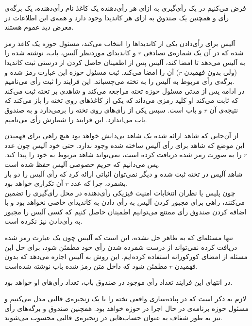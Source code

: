 \par
فرض می‌کنیم در یک رأی‌گیری به ازای هر رأی‌دهنده یک کاغذ نام رأی‌دهنده، یک برگه‌ی رأی و همچنین یک صندوق به ازای هر کاندیدا وجود دارد و همه‌ی این اطلاعات در معرض دید عموم هستند. 
\par
آلیس برای رأی‌دادن یکی از کاندیداها را انتخاب می‌کند، مسئول حوزه یک کاغذ رمز شده که در آن یک شماره‌ی تصادفی $r$ و کاندیدای موردنظر آلیس، باب، نوشته شده را به آلیس می‌دهد تا امضا کند، آلیس پس از اطمینان حاصل کردن از درستی ثبت کاندیدا (ولی بدون فهمیدن $r$) آن را امضا می‌کند. ثبت مسئول حوزه این عبارت رمز شده و برگه‌ی رأی مربوط به آلیس را به تخته می‌چسباند. این فرایند را ثبت رأی‌ می‌نامیم.
\\
در ادامه پس از مدتی مسئول حوزه تخته مراجعه‌ می‌کند و شاهدی
 بر تخته ثبت می‌کند که ثابت می‌کند او کلید رمزی می‌داند که یکی از کاغذ‌های روی تخته را باز می‌کند که نتیجه‌ی آن $r$ و باب است. سپس یکی از رأی‌های روی تخته را برمی‌دارد و به صندوق باب می‌اندازد. این فرایند را شمارش رأی‌ می‌نامیم.
\par
از آن‌جایی که شاهد ارائه شده یک شاهد بی‌دانش خواهد بود هیچ راهی برای فهمیدن این موضع که شاهد برای رأی آلیس ساخته شده وجود ندارد. حتی خود آلیس چون عدد $r$ را به صورت رمز شده دریافت کرده است، نمی‌تواند شاهد مربوط به خود را پیدا کند. پس می‌دانیم که حریم خصوصی آلیس حفظ شده است. 
\\
 شاهد آلیس در تخته ثبت شده و دیگر نمی‌توان اثباتی ارائه کرد که رأی آلیس را دو بار بشمرد، چرا که عدد $r$ آن تکراری خواهد بود.
\\
چون پلیس یا نظران انتخابات امنیت فیزیکی رأی‌دهنده در محل رأی‌گیری را تضمین می‌کنند، راهی برای مجبور کردن آلیس به رأی دادن به کاندیدای خاصی نخواهد بود و با اضافه کردن صندوق رأی ممتنع می‌توانیم اطمینان حاصل کنیم که کسی آلیس را مجبور به رأی‌دادن نیز نکرده است. 
\par 
تنها مسئله‌ای که به ظاهر حل نشده، این است که آلیس چون یک عبارت رمز شده دریافت کرده نمی‌تواند از درست شمرده شدن رأی خود مطمئن شود، برای حل این مسئله از امضای کورکورانه استفاده کرده‌ایم. این روش به آلیس اجازه می‌دهد که بدون فهمیدن $r$ مطمئن شود که داخل متن رمز شده باب نوشته شده‌است. 
\par 
در انتهای این فرایند تعداد رأی‌ موجود در صندوق باب، تعداد رأی‌های او خواهد بود.
\par 
لازم به ذکر است که در پیاده‌سازی واقعی تخته را با یک زنجیره‌ی قالبی مدل می‌کنیم و مسئول حوزه برنامه‌ی در حال اجرا در حوزه‌ خواهد بود. همچنین صندوق و برگه‌ها‌ی رأی نیز به طور شفاف به عنوان حساب‌هایی در زنجیره‌ی قالبی  محسوب می‌شوند. 


